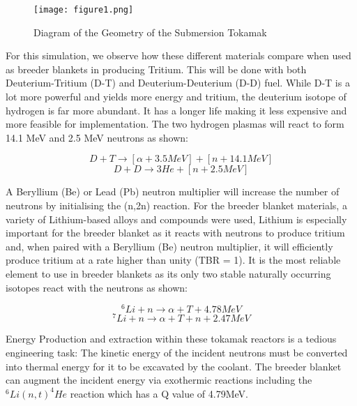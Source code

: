 \documentclass{article}
\begin{document}
\begin{figure}[hbt!]
  \centering
  \texttt{[image: figure1.png]}
  \caption{Diagram of the Geometry of the Submersion Tokamak}
  \label{fig:fig1}
\end{figure}

For this simulation, we observe how these different materials compare when used as breeder blankets in producing Tritium. This will be done with both Deuterium-Tritium (D-T) and Deuterium-Deuterium (D-D) fuel. While D-T is a lot more powerful and yields more energy and tritium, the deuterium isotope of hydrogen is far more abundant. It has a longer life making it less expensive and more feasible for implementation. The two hydrogen plasmas will react to form 14.1 MeV and 2.5 MeV neutrons as shown:

\begin{equation}
D + T \rightarrow [\alpha + 3.5 MeV] + [n + 14.1 MeV]
\end{equation}
\begin{equation}
D + D \rightarrow 3He + [n + 2.5 MeV]
\end{equation}

A Beryllium (Be) or Lead (Pb) neutron multiplier will increase the number of neutrons by initialising the (n,2n) reaction. For the breeder blanket materials, a variety of Lithium-based alloys and compounds were used, Lithium is especially important for the breeder blanket as it reacts with neutrons to produce tritium and, when paired with a Beryllium (Be) neutron multiplier, it will efficiently produce tritium at a rate higher than unity (TBR = 1). It is the most reliable element to use in breeder blankets as its only two stable naturally occurring isotopes react with the neutrons as shown:

\begin{equation}
^6Li + n \rightarrow \alpha + T + 4.78 MeV
\end{equation}
\begin{equation}
^7Li + n \rightarrow \alpha + T + n + 2.47 MeV
\end{equation}

Energy Production and extraction within these tokamak reactors is a tedious engineering task: The kinetic energy of the incident neutrons must be converted into thermal energy for it to be excavated by the coolant. The breeder blanket can augment the incident energy via exothermic reactions including the $^6Li(n,t)^4He$ reaction which has a Q value of 4.79MeV. 
\end{document}
